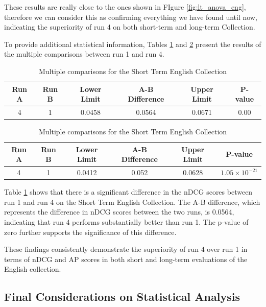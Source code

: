 These results are really close to the ones shown in FIgure \ref{fig:lt_anova_eng}, therefore we can consider this as confirming everything we have found until now, indicating the superiority of run 4 on both short-term and long-term Collection.

To provide additional statistical information, Tables \ref{table:st_anova_eng} and \ref{table:st_anova_eng_ap} present the results of the multiple comparisons between run 1 and run 4.

\begin{table}[!h]
    \centering
    \caption{Multiple comparisons for the Short Term English Collection}
    \label{table:st_anova_eng}
    \begin{tabular}{cccccc}
    \hline
    Run A & Run B & Lower Limit & A-B Difference & Upper Limit & P-value \\
    \hline
    4 & 1 & 0.0458 & 0.0564 & 0.0671 & 0.00 \\
    \hline
    \end{tabular}
\end{table}

\begin{table}[!h]
    \centering
    \caption{Multiple comparisons for the Short Term English Collection}
    \label{table:st_anova_eng_ap}
    \begin{tabular}{cccccc}
    \hline
    Run A & Run B & Lower Limit & A-B Difference & Upper Limit & P-value \\
    \hline
    4 & 1 & 0.0412 & 0.052 & 0.0628 & $1.05 \times 10^{-21}$ \\
    \hline
    \end{tabular}
\end{table}

Table \ref{table:st_anova_eng} shows that there is a significant difference in the \ac{nDCG} scores between run 1 and run 4 on the Short Term English Collection. 
The A-B difference, which represents the difference in \ac{nDCG} scores between the two runs, is 0.0564, indicating that run 4 performs substantially better than run 1. 
The p-value of zero further supports the significance of this difference.

These findings consistently demonstrate the superiority of run 4 over run 1 in terms of \ac{nDCG} and \ac{AP} scores in both short and long-term evaluations of the English collection.



\subsection{Final Considerations on Statistical Analysis}

